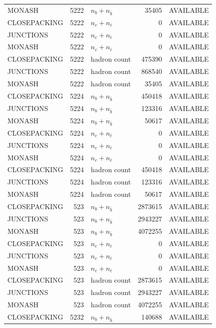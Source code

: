 \begin{landscape}
\begin{longtable}{@{}lrlrl@{}}
MONASH & 5222 & $n_b+n_{\bar b}$ & \num{35405} & AVAILABLE \\
CLOSEPACKING & 5222 & $n_c+n_{\bar c}$ & \num{0} & AVAILABLE \\
JUNCTIONS & 5222 & $n_c+n_{\bar c}$ & \num{0} & AVAILABLE \\
MONASH & 5222 & $n_c+n_{\bar c}$ & \num{0} & AVAILABLE \\
CLOSEPACKING & 5222 & hadron count & \num{475390} & AVAILABLE \\
JUNCTIONS & 5222 & hadron count & \num{868540} & AVAILABLE \\
MONASH & 5222 & hadron count & \num{35405} & AVAILABLE \\
CLOSEPACKING & 5224 & $n_b+n_{\bar b}$ & \num{450418} & AVAILABLE \\
JUNCTIONS & 5224 & $n_b+n_{\bar b}$ & \num{123316} & AVAILABLE \\
MONASH & 5224 & $n_b+n_{\bar b}$ & \num{50617} & AVAILABLE \\
CLOSEPACKING & 5224 & $n_c+n_{\bar c}$ & \num{0} & AVAILABLE \\
JUNCTIONS & 5224 & $n_c+n_{\bar c}$ & \num{0} & AVAILABLE \\
MONASH & 5224 & $n_c+n_{\bar c}$ & \num{0} & AVAILABLE \\
CLOSEPACKING & 5224 & hadron count & \num{450418} & AVAILABLE \\
JUNCTIONS & 5224 & hadron count & \num{123316} & AVAILABLE \\
MONASH & 5224 & hadron count & \num{50617} & AVAILABLE \\
CLOSEPACKING & 523 & $n_b+n_{\bar b}$ & \num{2873615} & AVAILABLE \\
JUNCTIONS & 523 & $n_b+n_{\bar b}$ & \num{2943227} & AVAILABLE \\
MONASH & 523 & $n_b+n_{\bar b}$ & \num{4072255} & AVAILABLE \\
CLOSEPACKING & 523 & $n_c+n_{\bar c}$ & \num{0} & AVAILABLE \\
JUNCTIONS & 523 & $n_c+n_{\bar c}$ & \num{0} & AVAILABLE \\
MONASH & 523 & $n_c+n_{\bar c}$ & \num{0} & AVAILABLE \\
CLOSEPACKING & 523 & hadron count & \num{2873615} & AVAILABLE \\
JUNCTIONS & 523 & hadron count & \num{2943227} & AVAILABLE \\
MONASH & 523 & hadron count & \num{4072255} & AVAILABLE \\
CLOSEPACKING & 5232 & $n_b+n_{\bar b}$ & \num{140688} & AVAILABLE \\

\end{longtable}
\end{landscape}

